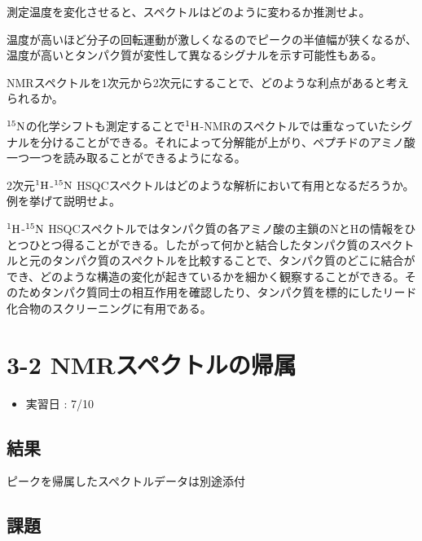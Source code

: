 \documentclass[a4paper,papersize,dvipdfmx]{jsarticle}
\begin{document}
\begin{tcolorbox}[colback=white,colbacktitle=black!10!white,coltitle=black,title={8}]
測定温度を変化させると、スペクトルはどのように変わるか推測せよ。
\end{tcolorbox}

温度が高いほど分子の回転運動が激しくなるのでピークの半値幅が狭くなるが、温度が高いとタンパク質が変性して異なるシグナルを示す可能性もある。


\begin{tcolorbox}[colback=white,colbacktitle=black!10!white,coltitle=black,title={9}]
NMRスペクトルを1次元から2次元にすることで、どのような利点があると考えられるか。
\end{tcolorbox}

$\rm ^{15}N$の化学シフトも測定することで$\rm ^1H$-NMRのスペクトルでは重なっていたシグナルを分けることができる。それによって分解能が上がり、ペプチドのアミノ酸一つ一つを読み取ることができるようになる。


\begin{tcolorbox}[colback=white,colbacktitle=black!10!white,coltitle=black,title={10}]
2次元$\rm ^1H$-$\rm ^{15}N$ HSQCスペクトルはどのような解析において有用となるだろうか。例を挙げて説明せよ。
\end{tcolorbox}

$\rm ^1H$-$\rm ^{15}N$ HSQCスペクトルではタンパク質の各アミノ酸の主鎖のNとHの情報をひとつひとつ得ることができる。したがって何かと結合したタンパク質のスペクトルと元のタンパク質のスペクトルを比較することで、タンパク質のどこに結合ができ、どのような構造の変化が起きているかを細かく観察することができる。そのためタンパク質同士の相互作用を確認したり、タンパク質を標的にしたリード化合物のスクリーニングに有用である。

\newpage

\section*{3-2 NMRスペクトルの帰属}

\begin{itemize}
\item 実習日 : 7/10

\end{itemize}
\subsection*{結果}
ピークを帰属したスペクトルデータは別途添付

\subsection*{課題}
\end{document}
